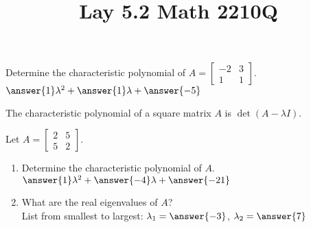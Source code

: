 \documentclass{ximera}
\begin{document}
  	\title{Lay 5.2  \hfill Math 2210Q} 
  	  		    \begin{question} Determine the characteristic polynomial of $A = \begin{bmatrix} -2 &3 \\1&1\end{bmatrix}$.\\
  	  		    	
  	  		    $\answer{1}\lambda^2 +\answer{1}\lambda +\answer{-5}$
  	  		    
  	  		    \begin{hint}
  	  		    	The characteristic polynomial of a square matrix $A$ is $\det(A-\lambda I)$.
  	  		    	\end{hint}
  	  		    
  	  		    	
  	  		    \end{question}	
  	  		    \begin{question} Let $A= \begin{bmatrix} 2 &5 \\5&2\end{bmatrix}$.\\
  	  		    	
  	  		    	\begin{enumerate}
  	  		    		\item Determine the characteristic polynomial of $A$. \\
  	  		    		
  	  		    		$\answer{1}\lambda^2 +\answer{-4}\lambda +\answer{-21}$\\
  	  		    		
  	  		    		\item What are the real eigenvalues of $A$?\\
  	  		    		
  	  		    		List from smallest to largest: $\lambda_1 = \answer{-3}$, $\lambda_2 = \answer{7}$
  	  		    	\end{enumerate}
  	  		    
  	  		    \end{question}	
\end{document}
